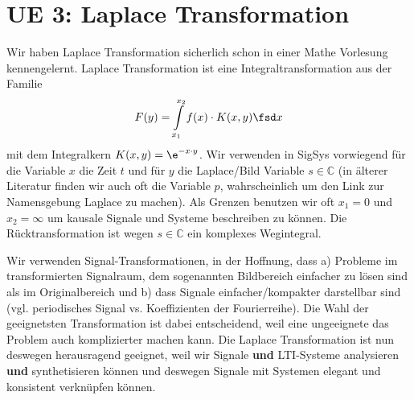 \clearpage
\section{UE 3: Laplace Transformation}
\label{sec:ue3_laplace}
%
Wir haben Laplace Transformation sicherlich schon in einer Mathe Vorlesung
kennengelernt.
Laplace Transformation ist eine Integraltransformation aus der Familie
\begin{equation}
F(y) = \int\limits_{x_1}^{x_2} f(x) \cdot K(x,y) \fsd x
\end{equation}
mit dem Integralkern $K(x,y) = \e^{-x \cdot y}$.
Wir verwenden in SigSys vorwiegend für die Variable $x$ die Zeit $t$ und für
$y$ die Laplace/Bild Variable $s\in\mathbb{C}$ (in älterer Literatur finden
wir auch oft die Variable $p$, wahrscheinlich um den Link zur Namensgebung
La\underline{p}lace zu machen).
Als Grenzen benutzen wir oft $x_1=0$ und $x_2=\infty$ um kausale Signale und
Systeme beschreiben zu können.
%
Die Rücktransformation ist wegen $s\in\mathbb{C}$ ein komplexes Wegintegral.

Wir verwenden Signal-Transformationen, in der Hoffnung, dass a) Probleme im
transformierten Signalraum, dem sogenannten Bildbereich einfacher zu lösen
sind als im Originalbereich und b) dass Signale einfacher/kompakter darstellbar
sind (vgl. periodisches Signal vs. Koeffizienten der Fourierreihe).
%
Die Wahl der geeignetsten Transformation ist dabei entscheidend, weil eine
ungeeignete das Problem auch komplizierter machen kann.
%
Die Laplace Transformation ist nun deswegen herausragend geeignet, weil
wir Signale \textbf{und} LTI-Systeme analysieren \textbf{und} synthetisieren
können und deswegen Signale mit Systemen elegant und konsistent verknüpfen können.

